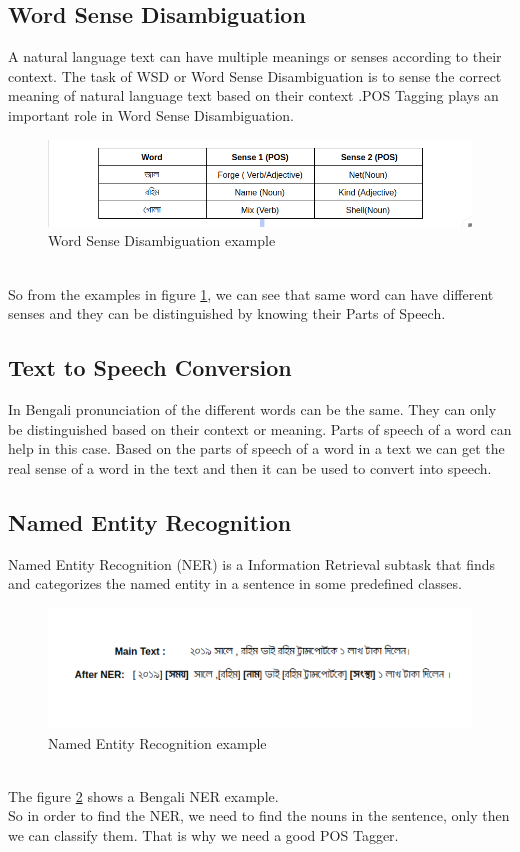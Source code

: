 \documentclass{standalone}
\begin{document}
\subsection{Word Sense Disambiguation}
A natural language text can have multiple meanings or senses according to their context. The task of WSD or Word Sense Disambiguation is to sense the correct meaning of natural language text based on their context \cite{cite5} \cite{cite6}.POS Tagging plays an important role in Word Sense Disambiguation.\\
\begin{figure}[h!]
\centering
\includegraphics[width=1.0\columnwidth]{img/WSD.png}
\caption{Word Sense Disambiguation example}
\label{WSD}
\end{figure}
\\
 So from the examples in figure \ref{WSD}, we can see that same word can have different senses and they can be distinguished by knowing their Parts of Speech.
\subsection{Text to Speech Conversion}
In Bengali pronunciation  of the different words can be the same. They can only be distinguished based on their context or meaning. Parts of speech of a word can help in this case. Based on the parts of speech of a word in a text we can get the real sense of a word in the text and then it can be used to convert into speech.
\subsection{Named Entity Recognition}
Named Entity Recognition (NER) is a Information Retrieval subtask that finds and categorizes the named entity in a sentence in some predefined classes.\\
\begin{figure}[h!]
\centering
\includegraphics[width=1.0\columnwidth]{img/NER1.png}
\caption{Named Entity Recognition example}
\label{NER}
\end{figure}
\\
The figure \ref{NER} shows a Bengali NER example.\\
So in order to find the NER, we need to find the nouns in the sentence, only then we can classify them. That is why we need a good POS Tagger.
\end{document}
